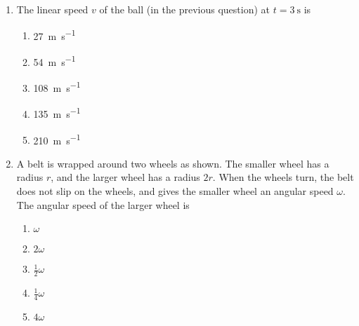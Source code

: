 \documentclass{../../../oss-apphys}
\begin{document}
\begin{multicols}{2}
\begin{enumerate}[leftmargin=18pt]
  \item The linear speed $v$ of the ball (in the previous question) at
    $t=\SI{3}{\second}$ is
    \begin{enumerate}[noitemsep,topsep=0pt,leftmargin=18pt,label=(\Alph*)]
    \item\SI{27 }{\metre\per\second}
    \item\SI{54 }{\metre\per\second}
    \item\SI{108}{\metre\per\second}
    \item\SI{135}{\metre\per\second}
    \item\SI{210}{\metre\per\second}
    \end{enumerate}
  
    
  \item A belt is wrapped around two wheels as shown. The smaller wheel has
    a radius $r$, and the larger wheel has a radius $2r$. When the wheels turn,
    the belt does not slip on the wheels, and gives the smaller wheel an
    angular speed $\omega$. The angular speed of the larger wheel is
    \begin{center}
    \end{center}
    \begin{enumerate}[noitemsep,topsep=0pt,leftmargin=18pt,label=(\Alph*)]
    \item $\displaystyle \omega$
    \item $\displaystyle 2\omega$
    \item $\displaystyle \frac12\omega$
    \item $\displaystyle \frac14\omega$
    \item $\displaystyle 4\omega$
    \end{enumerate}
  \end{enumerate}
\end{multicols}
\end{document}
